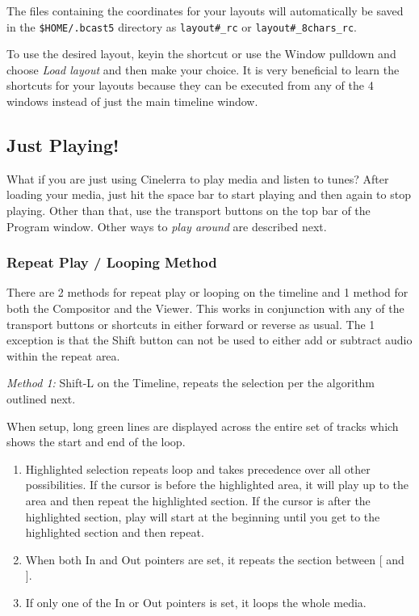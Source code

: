 The files containing the coordinates for your layouts will automatically be saved in the \texttt{\$HOME/.bcast5} directory as \texttt{layout\#\_rc} or \texttt{layout\#\_8chars\_rc}.

To use the desired layout, keyin the shortcut or use the Window pulldown and choose \emph{Load layout} and then make your choice. It is very beneficial to learn the shortcuts for your
layouts because they can be executed from any of the 4 windows instead of just the main
timeline window.

\subsection{Just Playing!}%
\label{sub:just_playing_}
What if you are just using Cinelerra to play media and listen to tunes? 
After loading your media, just hit the space bar to start playing and then again to stop playing.  
Other than that, use the transport buttons on the top bar of the Program window.  
Other ways to \textit{play around} are described next. 

\subsubsection*{Repeat Play / Looping Method}%
\label{ssub:repeat_play_looping_method}

There are 2 methods for repeat play or looping on the timeline and 1 method for both the Compositor and the Viewer.  This works in conjunction with any of the transport buttons or shortcuts in either forward or reverse as usual.  The 1 exception is that the Shift button can not be used to either add or subtract audio within the repeat area.

\textit{Method 1:} Shift-L on the Timeline, repeats the selection per the algorithm outlined next.
  
When setup, long green lines are displayed across the entire set of tracks which shows the start and end of the loop.
\begin{enumerate}
    \item  Highlighted selection repeats loop and takes precedence over all other possibilities.  
        If the cursor is before the highlighted area, it will play up to the area and then repeat the highlighted section.  
        If the cursor is after the highlighted section, play will start at the beginning until you get to the
        highlighted section and then repeat.
    \item  When both In and Out pointers are set, it repeats the section between [ and ].
    \item  If only one of the In or Out pointers is set, it loops the whole media.
\end{enumerate}

